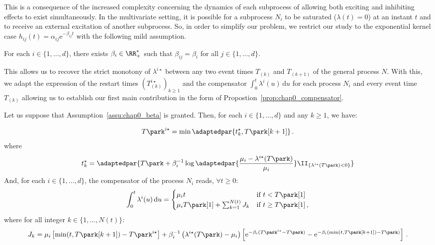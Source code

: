     This is a consequence of the increased complexity concerning the dynamics of each subprocess of allowing both exciting and inhibiting effects to exist simultaneously.
    In the multivariate setting, it is possible for a subprocess $N_i$ to be saturated ($\lambda(t)=0$) at an instant $t$ and to receive an external excitation of another subprocess.
    So, in order to simplify our problem, we restrict our study to the exponential kernel case $h_{ij}(t) = \alpha_{ij}\mathrm{e}^{-\beta_{ij} t}$ with the following mild assumption.

    \begin{assumption}\label{assu:chap0_beta}
      For each $i\in\{1,\ldots, d\}$, there exists $\beta_i\in\RR_+^*$ such that $\beta_{ij} = \beta_i$ for all $j\in\{1,\ldots, d\}$.
    \end{assumption}
    This allows us to recover the strict monotony of $\lambda^{i\star}$ between any two event times $T_{(k)}$ and $T_{(k+1)}$ of the general process $N$.
    With this, we adapt the expression of the restart times $(T_{(k)}^{i\star})_{k\geq 1}$ and the compensator $\int_{0}^{t}{\lambda^i(u)\,\mathrm{d}u}$ for each process $N_i$ and every event time $T_{(k)}$ allowing us to establish our first main contribution in the form of Propostion~\ref{prop:chap0_compensator}.

    \begin{proposition}\label{prop:chap0_compensator}
      Let us suppose that Assumption~\ref{assu:chap0_beta} is granted. 
      Then, for each $i\in\{1,\ldots, d\}$ and any $k\geq1$, we have:
      
      \begin{equation}\label{eq:chap3_restart_times_exponential}
        T\park^{i\star} = \min{\adaptedpar{t^\star_k, T\park[k+1]}}\,.
      \end{equation}
      where
      \[t^\star_k = \adaptedpar{T\park + \beta_i^{-1}\log{\adaptedpar{\frac{\mu_i - \lambda^{i\star}(T\park)}{\mu_i}}}\II_{\{\lambda^{i\star}(T\park) < 0\}}}\]
      And, for each $i\in\{1,\ldots, d\}$, the compensator of the process $N_i$ reads, $\forall t\geq 0$:
      \begin{equation}\label{eq:chap0_compensator_exponential}
        \int_{0}^{t}{\lambda^i(u)\,\mathrm{d}u} =
        \begin{cases}
          \mu_i t & \text{if } t < T\park[1] \\
          \mu_i T\park[1] + \sum_{k=1}^{N(t)} J_k & \text{if } t \geq T\park[1] \,,
        \end{cases}
      \end{equation}
      where for all integer \(k \in \{1, \dots, N(t)\}\):
      \begin{equation*}
        J_k =
        \mu_i \left[\min(t, T\park[k+1] ) - T\park^{i\star}\right] + \beta_i^{-1} \left(\lambda^{i\star}(T\park) - \mu_i \right)
        \left[ \mathrm{e}^{-\beta_i(T\park^{i\star} - T\park)} - \mathrm{e}^{-\beta_i(\min(t, T\park[k+1])- T\park)} \right]\,.
      \end{equation*}
      \end{proposition}

